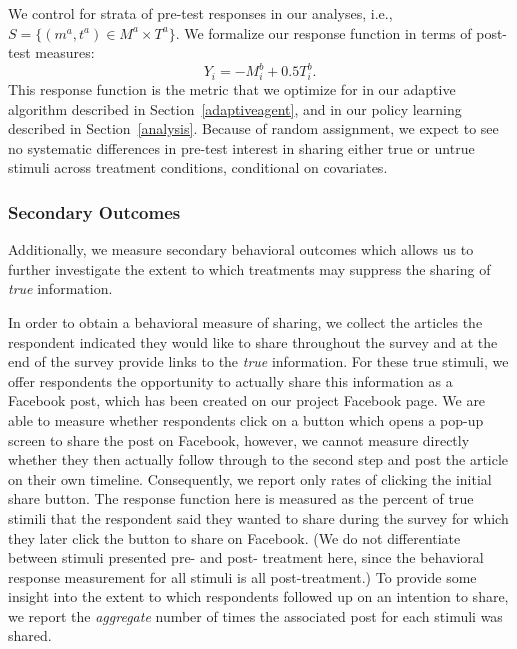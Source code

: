 \documentclass[letterpaper, 12pt, parskip=full,DIV=10]{scrartcl}
\begin{document}
We control for strata of pre-test responses in our analyses, i.e., $S=\{(m^a, t^a)\in M^a \times T^a\}$. 
We formalize our response function in terms of post-test measures:
\[
Y_i = -M^b_i + 0.5 T^b_i.
\]
This response function is the metric that we optimize for in our adaptive algorithm described in Section~\ref{adaptiveagent}, and in our policy learning described in Section~\ref{analysis}. Because of random assignment, we expect to see no systematic differences in pre-test interest in sharing either true or untrue stimuli across treatment conditions, conditional on covariates. %




\subsubsection{Secondary Outcomes}
Additionally, we measure secondary behavioral outcomes which allows us to further investigate the extent to which treatments may suppress the sharing of \textit{true} information.

In order to obtain a behavioral measure of sharing, we collect the articles the respondent indicated they would like to share throughout the survey and at the end of the survey provide links to the \textit{true} information. For these true stimuli, we offer respondents the opportunity to actually share this information as a Facebook post, which has been created on our project Facebook page. We are able to measure whether respondents click on a button which opens a pop-up screen to share the post on Facebook, however, we cannot measure directly whether they then actually follow through to the second step and post the article on their own timeline. Consequently, we report only rates of clicking the initial share button. The response function here is measured as the percent of true stimili that the respondent said they wanted to share during the survey for which they later click the button to share on Facebook. (We do not differentiate between stimuli presented pre- and post- treatment here, since the behavioral response measurement for all stimuli is all post-treatment.) To provide some insight into the extent to which respondents followed up on an intention to share, we report the \textit{aggregate} number of times the associated post for each stimuli was shared. %
\end{document}
